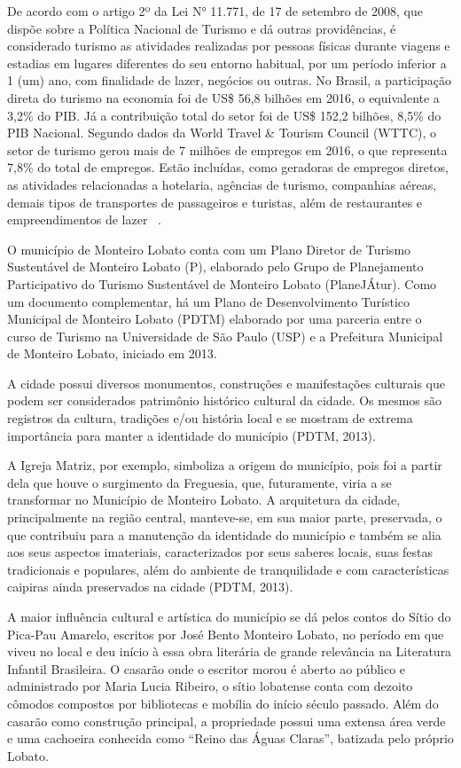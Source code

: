 De acordo com o artigo 2º da Lei N° 11.771, de 17 de setembro de 2008, que dispõe sobre a Política Nacional de Turismo e dá outras providências, é considerado turismo as atividades realizadas por pessoas físicas durante viagens e estadias em lugares diferentes do seu entorno habitual, por um período inferior a 1 (um) ano, com finalidade de lazer, negócios ou outras.
No Brasil, a participação direta do turismo na economia foi de US\$ 56,8 bilhões em 2016, o equivalente a 3,2\% do PIB. Já a contribuição total do setor foi de US\$ 152,2 bilhões, 8,5\% do PIB Nacional. Segundo dados da World Travel \& Tourism Council (WTTC), o setor de turismo gerou mais de 7 milhões de empregos em 2016, o que representa 7,8\% do total de empregos. Estão incluídas, como geradoras de empregos diretos, as atividades relacionadas a hotelaria, agências de turismo, companhias aéreas, demais tipos de transportes de passageiros e turistas, além de restaurantes e empreendimentos de lazer ~\cite{PNT2018}.

O município de Monteiro Lobato conta com um Plano Diretor de Turismo Sustentável de Monteiro Lobato (P), elaborado pelo Grupo de Planejamento Participativo do Turismo Sustentável de Monteiro Lobato (PlaneJÁtur). Como um documento complementar, há um Plano de Desenvolvimento Turístico Municipal de Monteiro Lobato (PDTM) elaborado por uma parceria entre o curso de Turismo na Universidade de São Paulo (USP) e a Prefeitura Municipal de Monteiro Lobato, iniciado em 2013.

A cidade possui diversos monumentos, construções e manifestações culturais que podem ser considerados patrimônio histórico cultural da cidade. Os mesmos são registros da cultura, tradições e/ou história local e se mostram de extrema importância para manter a identidade do município (PDTM, 2013).

A Igreja Matriz, por exemplo, simboliza a origem do município, pois foi a partir dela que houve o surgimento da Freguesia, que, futuramente, viria a se transformar no Município de Monteiro Lobato. A arquitetura da cidade, principalmente na região central, manteve-se, em sua maior parte, preservada, o que contribuiu para a manutenção da identidade do município e também se alia aos seus aspectos imateriais, caracterizados por seus saberes locais, suas festas tradicionais e populares, além do ambiente de tranquilidade e com características caipiras ainda preservados na cidade (PDTM, 2013).

A maior influência cultural e artística do município se dá pelos contos do Sítio do Pica-Pau Amarelo, escritos por José Bento Monteiro Lobato, no período em que viveu no local e deu início à essa obra literária de grande relevância na Literatura Infantil Brasileira. O casarão onde o escritor morou é aberto ao público e administrado por Maria Lucia Ribeiro, o sítio lobatense conta com dezoito cômodos compostos por bibliotecas e mobília do início século passado. Além do casarão como construção principal, a propriedade possui uma extensa área verde e uma cachoeira conhecida como “Reino das Águas Claras”, batizada pelo próprio Lobato.


